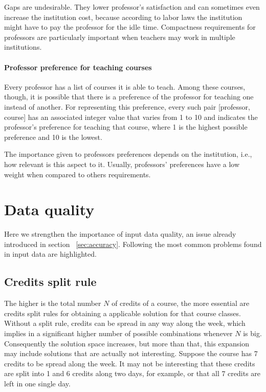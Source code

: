 Gaps are undesirable. They lower professor's satisfaction and can sometimes even increase the institution cost, because according to labor laws the institution might have to pay the professor for the idle time. Compactness requirements for professors are particularly important when teachers may work in multiple institutions.



\paragraph{Professor preference for teaching courses}
\label{constrprefercourse}

Every professor has a list of courses it is able to teach. Among these courses, though, it is possible that there is a preference of the professor for teaching one instead of another. For representing this preference, every such pair [professor, course] has an associated integer value that varies from 1 to 10 and indicates the professor's preference for teaching that course, where 1 is the highest possible preference and 10 is the lowest.

The importance given to professors preferences depends on the institution, i.e., how relevant is this aspect to it. Usually, professors' preferences have a low weight when compared to others requirements.



\section{Data quality}

Here we strengthen the importance of input data quality, an issue already introduced in section ~\ref{sec:accuracy}. Following the most common problems found in input data are highlighted.

\subsection{Credits split rule}

The higher is the total number $N$ of credits of a course, the more essential are credits split rules for obtaining a applicable solution for that course classes. Without a split rule, credits can be spread in any way along the week, which implies in a significant higher number of possible combinations whenever $N$ is big. Consequently the solution space increases, but more than that, this expansion may include solutions that are actually not interesting. Suppose the course  has 7 credits to be spread along the week. It may not be interesting that these credits are split into 1 and 6 credits along two days, for example, or that all 7 credits are left in one single day.

